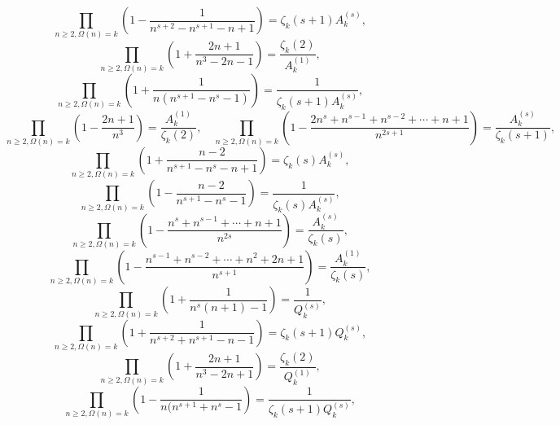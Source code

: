 \documentclass{amsart}
\begin{document}
\begin{equation}
\prod_{n\ge 2,\Omega(n)=k}
\left( 1-\frac{1}{n^{s+2}-n^{s+1}-n+1}\right)
=
\zeta_k(s+1) A_k^{(s)},
\end{equation}
\begin{equation}
\prod_{n\ge 2,\Omega(n)=k}
\left( 1+\frac{2n+1}{n^3-2n-1}\right)
=
\frac{\zeta_k(2)}{A_k^{(1)}},
\end{equation}
\begin{equation}
\prod_{n\ge 2,\Omega(n)=k}
\left( 1+\frac{1}{n(n^{s+1}-n^s-1)}\right)
=
\frac{1}{\zeta_k(s+1)A_k^{(s)}},
\end{equation}
\begin{equation}
\prod_{n\ge 2,\Omega(n)=k}
\left( 1-\frac{2n+1}{n^3}\right)
=
\frac{ A_k^{(1)} } { \zeta_k(2) },
\quad
\prod_{n\ge 2,\Omega(n)=k}
\left( 1-\frac{2n^s+n^{s-1}+n^{s-2}+\cdots+n+1}{n^{2s+1}}\right)
=
\frac{ A_k^{(s)} } { \zeta_k(s+1) },
\end{equation}
\begin{equation}
\prod_{n\ge 2,\Omega(n)=k}
\left( 1+\frac{n-2}{n^{s+1}-n^s-n+1}\right)
=
\zeta_k(s)A_k^{(s)},
\end{equation}
\begin{equation}
\prod_{n\ge 2,\Omega(n)=k}
\left( 1-\frac{n-2}{n^{s+1}-n^s-1}\right)
=
\frac{1}{\zeta_k(s)A_k^{(s)} },
\end{equation}
\begin{equation}
\prod_{n\ge 2,\Omega(n)=k}
\left( 1-\frac{n^s+n^{s-1}+\cdots+n+1}{n^{2s}}\right)
=
\frac{ A_k^{(s)} } { \zeta_k(s) },
\end{equation}
\begin{equation}
\prod_{n\ge 2,\Omega(n)=k}
\left( 1-\frac{n^{s-1}+n^{s-2}+\cdots+n^2+2n+1}{n^{s+1}}\right)
=
\frac{ A_k^{(1)} } { \zeta_k(s) },
\end{equation}
\begin{equation}
\prod_{n\ge 2,\Omega(n)=k}
\left( 1+\frac{1}{n^s(n+1)-1}\right)
=
\frac{1}{ Q_k^{(s)}},
\end{equation}
\begin{equation}
\prod_{n\ge 2,\Omega(n)=k}
\left( 1+\frac{1}{n^{s+2}+n^{s+1}-n-1}\right)
=
\zeta_k(s+1) Q_k^{(s)},
\end{equation}
\begin{equation}
\prod_{n\ge 2,\Omega(n)=k}
\left( 1+\frac{2n+1}{n^3-2n+1}\right)
=
\frac{\zeta_k(2)}{Q_k^{(1)}},
\end{equation}
\begin{equation}
\prod_{n\ge 2,\Omega(n)=k}
\left( 1-\frac{1}{n(n^{s+1}+n^s-1}\right)
=
\frac{1}{\zeta_k(s+1)Q_k^{(s)}},
\end{equation}
\end{document}
